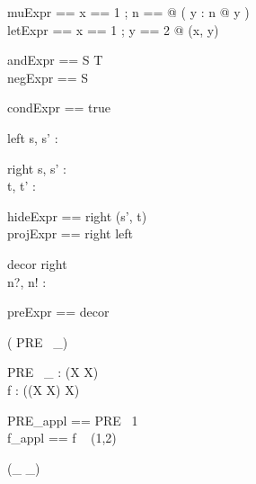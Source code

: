 \begin{zed}
  muExpr == \mu x == 1 ; n == \nat @ ( \mu y : n @ y )\\
  letExpr == \LET x == 1 ; y == 2 @ (x, y)
\end{zed}

\begin{zed}
  andExpr == S \land T\\
  negExpr == \lnot S
\end{zed}

\begin{zed}
  condExpr == \IF true  
\end{zed}

\begin{schema}{left}
  s, s' : \nat
\end{schema}

\begin{schema}{right}
  s, s' : \nat\\
  t, t' : \nat
\end{schema}

\begin{zed}
  hideExpr == right \hide (s', t)\\
  projExpr == right \project left
\end{zed}

\begin{schema}{decor}
  right\\
  n?, n! : \nat
\end{schema}

\begin{zed}
  preExpr == \pre decor
\end{zed}

\begin{zed}
\function  ( PRE~ \_)
\end{zed}

\begin{gendef}[X,Y]
  PRE~ \_ : \power (X \cross \power X)\\
  f       : \power ((X \cross X) \cross X)
\end{gendef}

\begin{zed}
  PRE\_appl == PRE~ 1\\
  f\_appl == f ~ (1,2)\\
\end{zed}

\begin{zed}
 \rightassoc (\_ \rel \_)
\end{zed}

